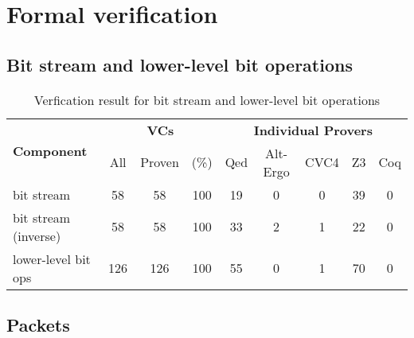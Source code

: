 
\chapter{Formal verification}
\label{cha:formal-verification}

\section{Bit stream and lower-level bit operations}
\label{sec:bitstream-verification}

\begin{table}[hbt]
\begin{center}
    \begin{tabular}{|l|ccc|ccccc|}
\hline
\multirow{2}{*}{\textbf{Component}} &
\multicolumn{3}{c|}{ \textbf{VCs}} &
\multicolumn{5}{c|}{\textbf{Individual Provers}}\\
\cline{2-9}
               &  All & Proven & (\%) & Qed & Alt-Ergo & CVC4 & Z3 & Coq \\
\hline
\hline
bit stream     & 58 &  58 & 100 & 19 &  0 & 0 & 39 & 0 \\
\hline
bit stream (inverse)  & 58 & 58 & 100 & 33 &  2 & 1 & 22 & 0 \\
\hline
lower-level bit ops & 126 & 126 & 100 & 55 &  0 & 1 & 70 & 0 \\
\hline
\end{tabular}
\end{center}
\caption{\label{tbl:bitstream-verification} Verfication result for bit stream and lower-level bit operations}
\end{table}


\section{Packets}


